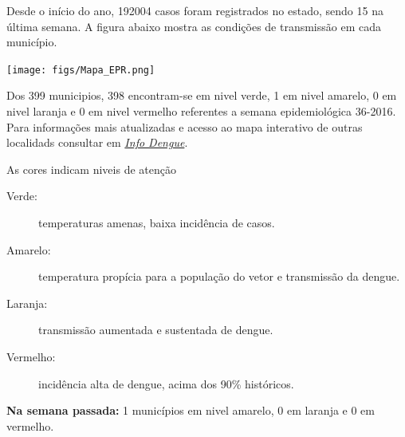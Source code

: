 \documentclass[10pt]{article} %
\begin{document}
\begin{minipage}[t]{.66\linewidth} %

\hypertarget{estado}{} %

Desde o início do ano, 192004 casos foram registrados no estado, sendo 15 na última semana. A figura abaixo mostra as condições de transmissão em cada município.

\texttt{[image: figs/Mapa\_EPR.png]}

Dos 399 municipios, 398 encontram-se em nivel verde, 1 em nivel amarelo, 0 em nivel laranja e 0 em nivel vermelho referentes a semana epidemiológica 36-2016. Para informações mais atualizadas e acesso ao mapa interativo de outras localidads consultar em \href{http://info.dengue.mat.br}{\textit{Info Dengue}}.


\vspace{1cm}
\begin{mdframed}[style=intextbox,frametitle={}] %

\hypertarget{descriptivebox}{} %
As cores indicam niveis de atenção
\begin{description}
\item[Verde:] temperaturas amenas, baixa incidência de casos.      
\item[Amarelo:] temperatura propícia para a população do vetor e transmissão da dengue.
\item[Laranja:] transmissão aumentada e sustentada de dengue. 
\item[Vermelho:] incidência alta de dengue, acima dos 90\% históricos.
\end{description}
\end{mdframed}

 \textbf{Na semana passada:} 1 municípios em nivel amarelo, 0 em laranja e 0 em vermelho.    

\end{minipage} %
\end{document}
